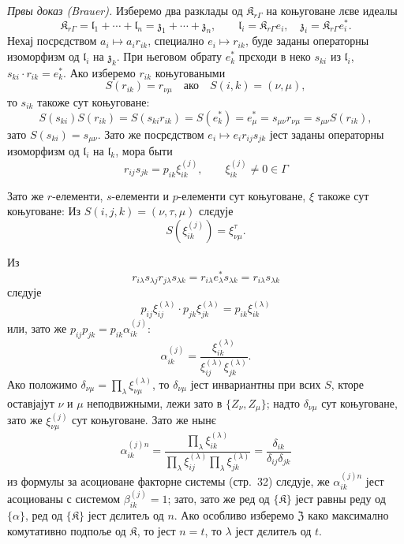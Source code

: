 \documentclass[11pt]{article}
\begin{document}
\emph{Првы доказ (Brauer).} Изберемо два разклады од \(\mathfrak K_{r\Gamma}\) на коњуговане лєве идеалы
\[
\mathfrak K_{r\Gamma}=\mathfrak l_1+\cdots+\mathfrak l_n=\mathfrak z_1+\cdots+\mathfrak z_n,\qquad
\mathfrak l_i=\mathfrak K_{r\Gamma}e_i,\quad
\mathfrak z_i=\mathfrak K_{r\Gamma}e_i^*.
\]
Нехај посрєдством \(a_i\mapsto a_ir_{ik}\), специално \(e_i\mapsto r_{ik}\), буде заданы операторны изоморфизм од \(\mathfrak l_i\) на \(\mathfrak z_k\). При његовом обрату \(e_k^*\) прєходи в неко \(s_{ki}\) из \(\mathfrak l_i\), \(s_{ki}\cdot r_{ik}=e_k^*\). Ако изберемо \(r_{ik}\) коњуговаными
\[
S(r_{ik})=r_{\nu\mu}\quad\text{ако}\quad S(i,k)=(\nu,\mu),
\]
то \(s_{ik}\) такоже сут коњуговане:
\[
S(s_{ki})S(r_{ik})=S(s_{ki}r_{ik})=S(e_k^*)=e_\mu^*
=s_{\mu\nu}r_{\nu\mu}=s_{\mu\nu}S(r_{ik}),
\]
зато \(S(s_{ki})=s_{\mu\nu}\). Зато же посрєдством \(e_i\mapsto e_ir_{ij}s_{jk}\) јест заданы операторны изоморфизм од \(\mathfrak l_i\) на \(\mathfrak l_k\), мора быти
\[
r_{ij}s_{jk}=p_{ik}\xi_{ik}^{(j)},\qquad
\xi_{ik}^{(j)}\ne0\in\Gamma
\]

Зато же \(r\)-елементи, \(s\)-елементи и \(p\)-елементи сут коњуговане, \(\xi\) такоже сут коњуговане: Из \(S(i,j,k)=(\nu,\tau,\mu)\) слєдује
\[
S(\xi_{ik}^{(j)})=\xi_{\nu\mu}^{\tau}.
\]

Из
\[
r_{i\lambda}s_{\lambda j}r_{j\lambda}s_{\lambda k}
=r_{i\lambda}e_\lambda^*s_{\lambda k}
=r_{i\lambda}s_{\lambda k}
\]
слєдује
\[
p_{ij}\xi_{ij}^{(\lambda)}\cdot p_{jk}\xi_{jk}^{(\lambda)}
=p_{ik}\xi_{ik}^{(\lambda)}
\]
или, зато же \(p_{ij}p_{jk}=p_{ik}\alpha_{ik}^{(j)}\):
\[
\alpha_{ik}^{(j)}
=\frac{\xi_{ik}^{(\lambda)}}{\xi_{ij}^{(\lambda)}\xi_{jk}^{(\lambda)}}.
\]
Ако положимо \(\delta_{\nu\mu}=\prod_{\lambda}\xi_{\nu\mu}^{(\lambda)}\), то \(\delta_{\nu\mu}\) јест инвариантны при всих \(S\), кторе оставјајут \(\nu\) и \(\mu\) неподвижными, лежи зато в \(\{Z_\nu,Z_\mu\}\); надто \(\delta_{\nu\mu}\) сут коњуговане, зато же \(\xi_{\nu\mu}^{(j)}\) сут коњуговане. Зато же нынє
\[
\alpha_{ik}^{(j)n}
=\frac{\prod_{\lambda}\xi_{ik}^{(\lambda)}}
       {\prod_{\lambda}\xi_{ij}^{(\lambda)}\prod_{\lambda}\xi_{jk}^{(\lambda)}}
=\frac{\delta_{ik}}{\delta_{ij}\delta_{jk}}
\]
из формулы за асоциоване факторне системы (стр.~32) слєдује, же \(\alpha_{ik}^{(j)n}\) јест асоциованы с системом \(\beta_{ik}^{(j)}=1\); зато, зато же ред од \(\{\mathfrak K\}\) јест равны реду од \(\{\alpha\}\), ред од \(\{\mathfrak K\}\) јест дєлитељ од \(n\). Ако особливо изберемо \(\mathfrak Z\) како максимално комутативно подпоље од \(\mathfrak K\), то јест \(n=t\), то \(\lambda\) јест дєлитељ од \(t\).
\end{document}
